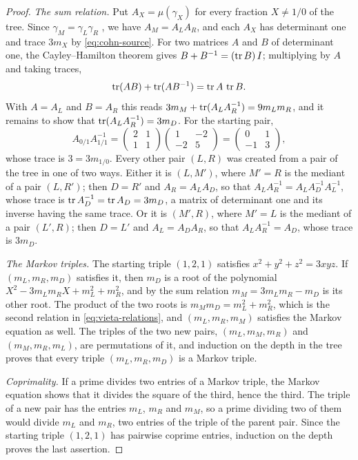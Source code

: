 \begin{proof}
\emph{The sum relation.} Put $A_X=\mu(\gamma_X)$ for every fraction $X\neq1/0$
of the tree. Since $\gamma_M=\gamma_L\gamma_R$ \cite{Reutenauer2009}, we have
$A_M=A_LA_R$, and each $A_X$ has determinant one and trace $3m_X$ by
\eqref{eq:cohn-source}. For two matrices $A$ and $B$ of determinant one, the
Cayley--Hamilton theorem gives $B+B^{-1}=(\operatorname{tr} B)\,I$; multiplying by $A$ and
taking traces,
$$
 \operatorname{tr}(AB)+\operatorname{tr}(AB^{-1})=\operatorname{tr} A\,\operatorname{tr} B .
$$
With $A=A_L$ and $B=A_R$ this reads $3m_M+\operatorname{tr}(A_LA_R^{-1})=9m_Lm_R$, and it
remains to show that $\operatorname{tr}(A_LA_R^{-1})=3m_D$. For the starting pair,
$$
 A_{0/1}A_{1/1}^{-1}
 =\begin{pmatrix}2&1\\1&1\end{pmatrix}\begin{pmatrix}1&-2\\-2&5\end{pmatrix}
 =\begin{pmatrix}0&1\\-1&3\end{pmatrix},
$$
whose trace is $3=3m_{1/0}$. Every other pair $(L,R)$ was created from a pair
of the tree in one of two ways. Either it is $(L,M')$, where $M'=R$ is the
mediant of a pair $(L,R')$; then $D=R'$ and $A_R=A_LA_D$, so that
$A_LA_R^{-1}=A_LA_D^{-1}A_L^{-1}$, whose trace is $\operatorname{tr} A_D^{-1}=\operatorname{tr} A_D=3m_D$, a
matrix of determinant one and its inverse having the same trace. Or it is
$(M',R)$, where $M'=L$ is the mediant of a pair $(L',R)$; then $D=L'$ and
$A_L=A_DA_R$, so that $A_LA_R^{-1}=A_D$, whose trace is $3m_D$.

\emph{The Markov triples.} The starting triple $(1,2,1)$ satisfies
$x^2+y^2+z^2=3xyz$. If $(m_L,m_R,m_D)$ satisfies it, then $m_D$ is a root of
the polynomial $X^2-3m_Lm_RX+m_L^2+m_R^2$, and by the sum relation
$m_M=3m_Lm_R-m_D$ is its other root. The product of the two roots is
$m_Mm_D=m_L^2+m_R^2$, which is the second relation in
\eqref{eq:vieta-relations}, and $(m_L,m_R,m_M)$ satisfies the Markov equation
as well. The triples of the two new pairs, $(m_L,m_M,m_R)$ and
$(m_M,m_R,m_L)$, are permutations of it, and induction on the depth in the
tree proves that every triple $(m_L,m_R,m_D)$ is a Markov triple.

\emph{Coprimality.} If a prime divides two entries of a Markov triple, the
Markov equation shows that it divides the square of the third, hence the
third. The triple of a new pair has the entries $m_L$, $m_R$ and $m_M$, so a
prime dividing two of them would divide $m_L$ and $m_R$, two entries of the
triple of the parent pair. Since the starting triple $(1,2,1)$ has pairwise
coprime entries, induction on the depth proves the last assertion.
\end{proof}

